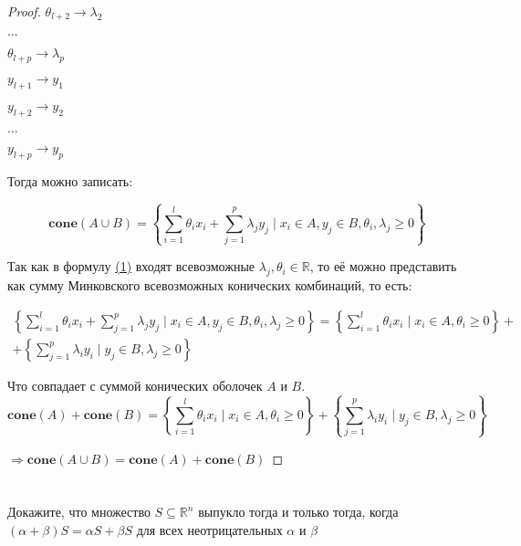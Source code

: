 \documentclass[a4paper,12pt]{article}
\begin{document}
\begin{proof}
$\theta_{l+2} \rightarrow \lambda_2$

$\dots$

$\theta_{l+p} \rightarrow \lambda_p$
\vspace{\baselineskip}

$y_{l+1} \rightarrow y_1$

$y_{l+2} \rightarrow y_2$

$\dots$

$y_{l+p} \rightarrow y_p$

Тогда можно записать:

\begin{equation}\label{formula1}
\mathbf{cone}(A \cup B) = \left\{ \sum\limits_{i=1}^l\theta_i x_i + \sum\limits_{j=1}^{p}\lambda_j y_j  \mid x_i \in A, y_j \in B, \theta_i, \lambda_j \ge 0\right\}
\end{equation}


Так как в формулу \hyperref[formula1]{(1)} входят всевозможные $\lambda_j, \theta_i \in \mathbb{R}$, то её можно представить как сумму Минковского всевозможных конических комбинаций, то есть:

\begin{multline}
\left\{ \sum\limits_{i=1}^l\theta_i x_i + \sum\limits_{j=1}^{p}\lambda_j y_j  \mid x_i \in A, y_j \in B, \theta_i, \lambda_j \ge 0\right\} = \left\{ \sum\limits_{i=1}^l\theta_i x_i \mid x_i \in A, \theta_i \ge 0\right\} +\\+
\left\{\sum\limits_{j=1}^p\lambda_i y_i \mid y_j \in B, \lambda_j \ge 0\right\} 
\end{multline}

Что совпадает с суммой конических оболочек $A$ и $B$.
\begin{equation}\label{formula2}
\mathbf{cone}(A) + \mathbf{cone}(B) = \left\{ \sum\limits_{i=1}^l\theta_i x_i \mid x_i \in A, \theta_i \ge 0\right\} +
\left\{\sum\limits_{j=1}^p\lambda_i y_i \mid y_j \in B, \lambda_j \ge 0\right\}
\end{equation}

$\Rightarrow \mathbf{cone}(A \cup B) = \mathbf{cone}(A) + \mathbf{cone}(B)$

\end{proof}


\section{}

Докажите, что множество $S \subseteq \mathbb{R}^n$ выпукло тогда и только тогда, когда $(\alpha + \beta)S = \alpha S + \beta S$ для всех неотрицательных $\alpha$ и $\beta$
\end{document}
